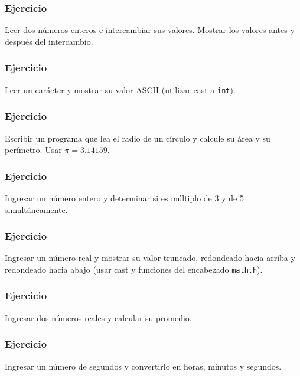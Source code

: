 \subsubsection{Ejercicio}
Leer dos números enteros e intercambiar sus valores. Mostrar los valores antes y después del intercambio.

\subsubsection{Ejercicio}
Leer un carácter y mostrar su valor ASCII (utilizar cast a \texttt{int}).

\subsubsection{Ejercicio}
Escribir un programa que lea el radio de un círculo y calcule su área y su perímetro.  
Usar \(\pi = 3.14159\).

\subsubsection{Ejercicio}
Ingresar un número entero y determinar si es múltiplo de 3 y de 5 simultáneamente.

\subsubsection{Ejercicio}
Ingresar un número real y mostrar su valor truncado, redondeado hacia arriba y redondeado hacia abajo (usar cast y funciones del encabezado \texttt{math.h}).

\subsubsection{Ejercicio}
Ingresar dos números reales y calcular su promedio.

\subsubsection{Ejercicio}
Ingresar un número de segundos y convertirlo en horas, minutos y segundos.




